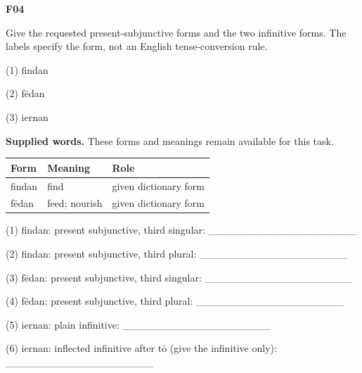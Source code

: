 \par\begin{minipage}{\linewidth}\raggedright
\textbf{F04}

Give the requested present-subjunctive forms and the two infinitive forms. The labels specify the form, not an English tense-conversion rule.

(1) findan

(2) fēdan

(3) iernan

\textbf{Supplied words.} These forms and meanings remain available for this task.

\par\begingroup
\fontsize{10.5}{13.2}\selectfont
\setlength{\LTleft}{0pt}\setlength{\LTright}{\fill}
\noindent
\begin{tabular}{@{}>{\raggedright\arraybackslash}p{33.87mm}>{\raggedright\arraybackslash}p{33.87mm}>{\raggedright\arraybackslash}p{50.64mm}@{}}
\toprule
\textbf{Form} & \textbf{Meaning} & \textbf{Role} \\
\midrule
findan & find & given dictionary form \\
fēdan & feed; nourish & given dictionary form \\
\bottomrule
\end{tabular}
\par\endgroup

(1) findan: present subjunctive, third singular: \_\_\_\_\_\_\_\_\_\_\_\_\_\_\_\_\_\_\_\_

(2) findan: present subjunctive, third plural: \_\_\_\_\_\_\_\_\_\_\_\_\_\_\_\_\_\_\_\_

(3) fēdan: present subjunctive, third singular: \_\_\_\_\_\_\_\_\_\_\_\_\_\_\_\_\_\_\_\_

(4) fēdan: present subjunctive, third plural: \_\_\_\_\_\_\_\_\_\_\_\_\_\_\_\_\_\_\_\_

(5) iernan: plain infinitive: \_\_\_\_\_\_\_\_\_\_\_\_\_\_\_\_\_\_\_\_

(6) iernan: inflected infinitive after tō (give the infinitive only): \_\_\_\_\_\_\_\_\_\_\_\_\_\_\_\_\_\_\_\_

\end{minipage}\par\addvspace{4pt}

